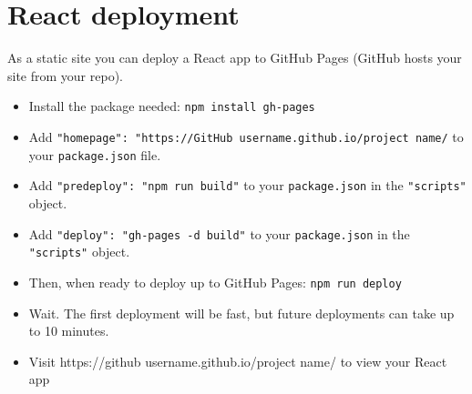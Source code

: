 \section{React deployment}

As a static site you can deploy a React app to GitHub Pages (GitHub hosts your site from your repo).

\begin{itemize}
    \item Install the package needed: \texttt{npm install gh-pages}
    \item Add \texttt{"homepage": "https://{GitHub username}.github.io/{project name}/} to your \texttt{package.json} file.
    \item Add \texttt{"predeploy": "npm run build"} to your \texttt{package.json} in the \texttt{"scripts"} object.
    \item Add \texttt{"deploy": "gh-pages -d build"} to your \texttt{package.json} in the \texttt{"scripts"} object.
    \item Then, when ready to deploy up to GitHub Pages: \texttt{npm run deploy}
    \item Wait. The first deployment will be fast, but future deployments can take up to 10 minutes.
    \item Visit https://{github username}.github.io/{project name}/ to view your React app
\end{itemize}
